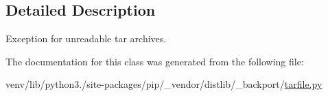\subsection{Detailed Description}
\begin{DoxyVerb}Exception for unreadable tar archives.\end{DoxyVerb}
 

The documentation for this class was generated from the following file\+:\begin{DoxyCompactItemize}
\item 
venv/lib/python3./site-\/packages/pip/\+\_\+vendor/distlib/\+\_\+backport/\hyperlink{tarfile_8py}{tarfile.\+py}\end{DoxyCompactItemize}
